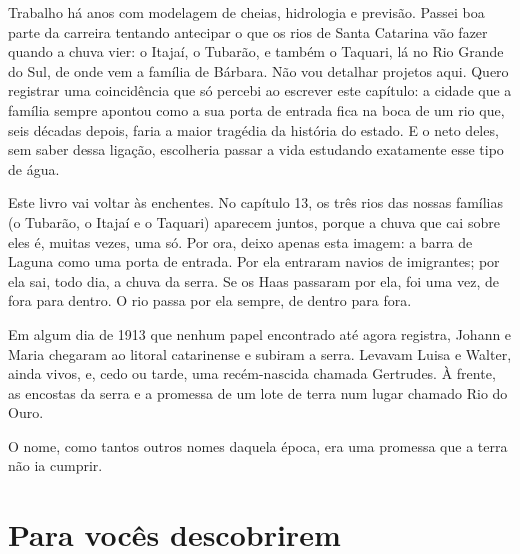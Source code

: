 \documentclass[
  brazilian,
  11pt,
  openany]{book}
\begin{document}
Trabalho há anos com modelagem de cheias, hidrologia e previsão. Passei
boa parte da carreira tentando antecipar o que os rios de Santa Catarina
vão fazer quando a chuva vier: o Itajaí, o Tubarão, e também o Taquari,
lá no Rio Grande do Sul, de onde vem a família de Bárbara. Não vou
detalhar projetos aqui. Quero registrar uma coincidência que só percebi
ao escrever este capítulo: a cidade que a família sempre apontou como a
sua porta de entrada fica na boca de um rio que, seis décadas depois,
faria a maior tragédia da história do estado. E o neto deles, sem saber
dessa ligação, escolheria passar a vida estudando exatamente esse tipo
de água.

Este livro vai voltar às enchentes. No capítulo 13, os três rios das
nossas famílias (o Tubarão, o Itajaí e o Taquari) aparecem juntos,
porque a chuva que cai sobre eles é, muitas vezes, uma só. Por ora,
deixo apenas esta imagem: a barra de Laguna como uma porta de entrada.
Por ela entraram navios de imigrantes; por ela sai, todo dia, a chuva da
serra. Se os Haas passaram por ela, foi uma vez, de fora para dentro. O
rio passa por ela sempre, de dentro para fora.

Em algum dia de 1913 que nenhum papel encontrado até agora registra,
Johann e Maria chegaram ao litoral catarinense e subiram a serra.
Levavam Luisa e Walter, ainda vivos, e, cedo ou tarde, uma recém-nascida
chamada Gertrudes. À frente, as encostas da serra e a promessa de um
lote de terra num lugar chamado Rio do Ouro.

O nome, como tantos outros nomes daquela época, era uma promessa que a
terra não ia cumprir.

\section{Para vocês descobrirem}\label{para-vocuxeas-descobrirem-4}
\end{document}
